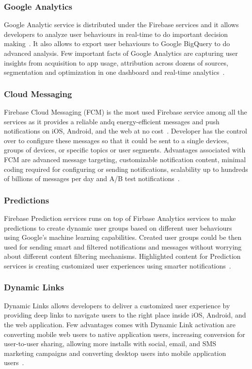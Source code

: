 \subsubsection{Google Analytics} Google Analytic service is
distributed under the Firebase services and it allows developers to
analyze user behaviours in real-time to do important decision
making~\cite{hid-sp18-409-www-firebase}. It also allows to export user
behaviours to Google BigQuery to do advanced analysis. Few important
facts of Google Analytics are capturing user insights from acquisition
to app usage, attribution across dozens of sources, segmentation and
optimization in one dashboard and real-time
analytics~\cite{hid-sp18-409-www-firebase-products}.

\subsubsection{Cloud Messaging} Firebase Cloud Messaging (FCM) is the
most used Firebase service among all the services as it provides a
reliable andq energy-efficient messages and push notifications on iOS,
Android, and the web at no
cost~\cite{hid-sp18-409-www-firebase-products}. Developer has the
control over to configure these messages so that it could be sent to a
single devices, groups of devices, or specific topics or user
segments. Advantages associated with FCM are advanced message
targeting, customizable notification content, minimal coding required
for configuring or sending notifications, scalability up to hundreds
of billions of messages per day and A/B test
notifications~\cite{hid-sp18-409-www-firebase-merged,
  hid-sp18-409-www-firebase-products}.

\subsubsection{Predictions} Firebase Prediction services runs on top
of Firbase Analytics services to make predictions to create dynamic
user groups based on different user behaviours using Google's machine
learning capabilities. Created user groups could be then used for
sending smart and filtered notifications and messages without worrying
about different content filtering mechanisms.  Highlighted content for
Prediction services is creating customized user experiences using
smarter notifications~\cite{hid-sp18-409-www-firebase-products}.

\subsubsection{Dynamic Links} Dynamic Links allows developers to
deliver a customized user experience by providing deep links to
navigate users to the right place inside iOS, Android, and the web
application. Few advantages comes with Dynamic Link activation are
converting mobile web users to native application users, increasing
conversion for user-to-user sharing, allowing more installs with
social, email, and SMS marketing campaigns and converting desktop
users into mobile application
users~\cite{hid-sp18-409-www-firebase-wikipedia,
  hid-sp18-409-www-firebase-products}.

